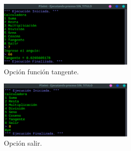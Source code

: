 \documentclass[11pt, a4paper]{report}
\begin{document}
\begin{figure}[!ht]
\begin{center}
  \includegraphics[width=0.6\textwidth]{respuesta20.png}
  \caption{Opci\'on funci\'on tangente.}
\end{center}
\end{figure} 

\begin{figure}[!ht]
\begin{center}
  \includegraphics[width=0.6\textwidth]{respuesta21.png}
  \caption{Opci\'on salir.}
\end{center}
\end{figure} 
 
\end{document}
